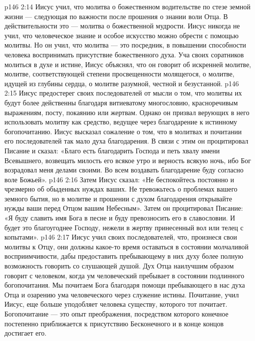 \vs p146 2:14 \pc {}\bibnobreakspace Иисус учил, что молитва о божественном водительстве по стезе земной жизни --- следующая по важности после прошения о знании воли Отца. В действительности это --- молитва о божественной мудрости. Иисус никогда не учил, что человеческое знание и особое искусство можно обрести с помощью молитвы. Но он учил, что молитва --- это посредник, в повышении способности человека воспринимать присутствие божественного духа. Уча своих соратников молиться в духе и истине, Иисус объяснял, что он говорит об искренней молитве, молитве, соответствующей степени просвещенности молящегося, о молитве, идущей из глубины сердца, о молитве разумной, честной и безустанной.
\vs p146 2:15 \pc {}\bibnobreakspace Иисус предостерег своих последователей от мысли о том, что молитвы их будут более действенны благодаря витиеватому многословию, красноречивым выражениям, посту, покаянию или жертвам. Однако он призвал верующих в него использовать молитву как средство, ведущее через благодарение к истинному богопочитанию. Иисус высказал сожаление о том, что в молитвах и почитании его последователей так мало духа благодарения. В связи с этим он процитировал Писание и сказал: «Благо есть благодарить Господа и петь хвалу имени Всевышнего, возвещать милость его всякое утро и верность всякую ночь, ибо Бог возрадовал меня делами своими. Во всем воздавать благодарение буду согласно воле Божьей».
\vs p146 2:16 \pc {}\bibnobreakspace Затем Иисус сказал: «Не беспокойтесь постоянно и чрезмерно об обыденных нуждах ваших. Не тревожьтесь о проблемах вашего земного бытия, но в молитве и прошении с духом благодарения открывайте нужды ваши перед Отцом вашим Небесным». Затем он процитировал Писание: «Я буду славить имя Бога в песне и буду превозносить его в славословии. И будет это благоугоднее Господу, нежели в жертву принесенный вол или телец с копытами».
\vs p146 2:17 \pc {}\bibnobreakspace Иисус учил своих последователей, что, произнеся свои молитвы к Отцу, они должны какое\hyp{}то время оставаться в состоянии молчаливой восприимчивости, дабы предоставить пребывающему в них духу более полную возможность говорить со слушающей душой. Дух Отца наилучшим образом говорит с человеком, когда ум человеческий пребывает в состоянии подлинного богопочитания. Мы почитаем Бога благодаря помощи пребывающего в нас духа Отца и озарению ума человеческого через служение истины. Почитание, учил Иисус, еще больше уподобляет человека существу, которого тот почитает. Богопочитание --- это опыт преображения, посредством которого конечное постепенно приближается к присутствию Бесконечного и в конце концов достигает его.
